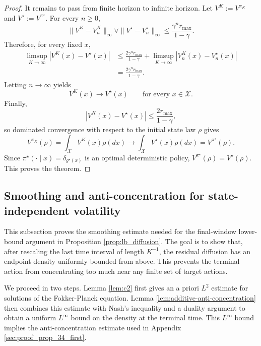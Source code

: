 \documentclass{article}
\newcommand{\1}{\mathbbm{1}}
\numberwithin{equation}{section}
\def\to{\rightarrow}
\begin{document}
\begin{proof}
It remains to pass from finite horizon to infinite horizon. Let
$V^K:=V^{\pi_K}$ and $V^\star:=V^{\pi^\star}$. For every \(n\ge0\),
\[
    \|V^K-V_n^K\|_\infty
    \vee
    \|V^\star-V_n^\star\|_\infty
    \le
    \frac{\gamma^nr_{\max}}{1-\gamma}.
\]
Therefore, for every fixed \(x\),
\[
\begin{aligned}
    \limsup_{K\to\infty}|V^K(x)-V^\star(x)|
    &\le
    \frac{2\gamma^nr_{\max}}{1-\gamma}
    +
    \limsup_{K\to\infty}|V_n^K(x)-V_n^\star(x)| \\
    &=
    \frac{2\gamma^nr_{\max}}{1-\gamma}.
\end{aligned}
\]
Letting \(n\to\infty\) yields
\[
    V^K(x)\to V^\star(x)
    \qquad\text{for every }x\in\mathcal X.
\]
Finally,
\[
    |V^K(x)-V^\star(x)|
    \le
    \frac{2r_{\max}}{1-\gamma},
\]
so dominated convergence with respect to the initial state law \(\rho\) gives
\[
    V^{\pi_K}(\rho)
    =
    \int_{\mathcal X}V^K(x)\rho(dx)
    \longrightarrow
    \int_{\mathcal X}V^\star(x)\rho(dx)
    =
    V^{\pi^\star}(\rho).
\]
Since \(\pi^\star(\cdot\mid x)=\delta_{g^\star(x)}\) is an optimal deterministic policy,
\(V^{\pi^\star}(\rho)=V^\star(\rho)\). This proves the theorem.
\end{proof}
\subsection{Smoothing and anti-concentration for state-independent volatility}
This subsection proves the smoothing estimate needed for the final-window lower-bound argument in Proposition \ref{prop:lb_diffusion}. The goal is to show that, after rescaling the last time interval of length \(K^{-1}\), the residual diffusion has an endpoint density uniformly bounded from above. This prevents the terminal action from concentrating too much near any finite set of target actions.

We proceed in two steps. Lemma \ref{lem:c2} first gives an a priori \(L^2\) estimate for solutions of the Fokker-Planck equation. Lemma \ref{lem:additive-anti-concentration} then combines this estimate with Nash's inequality and a duality argument to obtain a uniform \(L^\infty\) bound on the density at the terminal time. This \(L^\infty\)  bound implies the anti-concentration estimate used in Appendix \ref{sec:proof_prop_34_first}.
\end{document}
